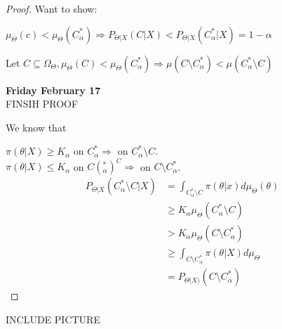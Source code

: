 \documentclass[11pt,fleqn]{book} %
\begin{document}
\begin{proof}

Want to show: 

	$\mu_\Theta (c) < \mu_\Theta(C_\alpha^*) \Rightarrow P_{\Theta|X}(C|X) < P_{\Theta|X}(C^*_\alpha| X) = 1 - \alpha $

Let $C \subseteq \Omega_\Theta, \mu_\Theta(C) < \mu_\Theta(C^*_\alpha) \Rightarrow \mu(C\setminus C_\alpha^*) < \mu(C_\alpha^* \setminus C)$

	
\textbf{Friday February 17}\\

FINSIH PROOF

We know that 

$\pi(\theta|X) \geq K_\alpha$ on $C^*_\alpha \Rightarrow$ on $C^*_\alpha \setminus C$.\\

$\pi(\theta|X) \leq K_\alpha$ on $C(^*_\alpha)^C \Rightarrow$ on $C \setminus C^*_\alpha$.\\

\begin{align*}
	P_{\Theta|X} (C_\alpha^* \setminus C |X) &= \int_{C_\alpha^* \setminus C} \pi(\theta | x) d\mu_\Theta(\theta)\\
		&\geq K_\alpha \mu_\Theta(C_\alpha^* \setminus C)\\
		&> K_\alpha \mu_\Theta(C \setminus C_\alpha^*)\\
		&\geq \int_{C \setminus C_\alpha^*} \pi(\theta|X) d\mu_\Theta\\
		&= P_{\Theta | X) }(C\setminus C_\alpha^*) 
\end{align*}

\end{proof}

INCLUDE PICTURE
\end{document}
